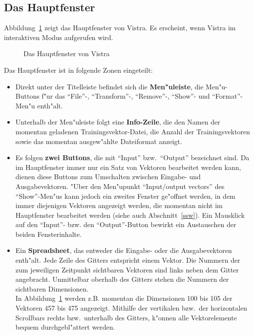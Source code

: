 \subsection{Das Hauptfenster}

Abbildung~\ref{hauptfenster} zeigt das Hauptfenster von Vistra.
Es erscheint, wenn Vistra im interaktiven Modus aufgerufen wird.

\begin{figure}[ht]
\centerline{}
\caption{\label{hauptfenster} Das Hauptfenster von Vistra}
\end{figure}  

Das Hauptfenster ist in folgende Zonen eingeteilt:
\begin{itemize}
\item Direkt unter der Titelleiste befindet sich die {\bf Men"uleiste}, die
Men"u-Buttons f"ur das "`File"'-, "`Transform"'-, "`Remove"'-, "`Show"'- und 
"`Format"'-Men"u enth"alt.

\item Unterhalb der Men"uleiste folgt eine {\bf Info-Zeile}, die den Namen der
momentan geladenen Trainingsvektor-Datei, die Anzahl der Trainingsvektoren
sowie das momentan ausgew"ahlte Dateiformat anzeigt.

\item Es folgen {\bf zwei Buttons}, die mit "`Input"' bzw.~"`Output"' 
bezeichnet sind. 
Da im Hauptfenster immer nur ein Satz von Vektoren bearbeitet werden kann,
dienen diese Buttons zum Umschalten zwischen Eingabe- und Ausgabevektoren.
"Uber den Men"upunkt "`Input/output vectors"' des "`Show"'-Men"us
kann jedoch ein zweites Fenster ge"offnet werden, in dem immer diejenigen
Vektoren angezeigt werden, die momentan nicht im Hauptfenster bearbeitet 
werden (siehe auch Abschnitt~\ref{ssw}).
Ein Mausklick auf den "`Input"'- bzw. den "`Output"'-Button bewirkt 
ein Austauschen der beiden Fensterinhalte.

\item Ein {\bf Spreadsheet}, das entweder die Eingabe- oder die
Ausgabevektoren enth"alt.
Jede Zeile des Gitters entspricht einem Vektor.
Die Nummern der zum jeweiligen Zeitpunkt sichtbaren Vektoren sind
links neben dem Gitter angebracht.
Unmittelbar oberhalb des Gitters stehen die Nummern der sichtbaren
Dimensionen. \\
In Abbildung~\ref{hauptfenster} werden z.B. momentan die Dimensionen
100 bis 105 der Vektoren 457 bis 475 angezeigt.
Mithilfe der vertikalen bzw.~der horizontalen Scrollbars rechts 
bzw.~unterhalb des Gitters, k"onnen alle Vektorelemente bequem 
durchgebl"attert werden.


\end{itemize}
